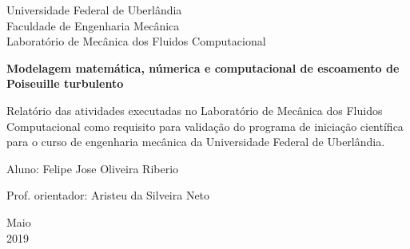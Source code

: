 \begin{titlepage}
	\begin{center}
	

		\Huge{Universidade Federal de Uberlândia}\\
		\large{Faculdade de Engenharia Mecânica}\\ 
		\large{Laboratório de Mecânica dos Fluidos Computacional}\\ 
\vspace{15pt}
        
        \vspace{85pt}
        
		\textbf{\LARGE{Modelagem matemática, númerica e computacional de escoamento de Poiseuille
				turbulento}}
			
	\end{center}
\vspace{1,5cm}
	
	\begin{flushright}

   \begin{list}{}{
      \setlength{\leftmargin}{4.5cm}
      \setlength{\rightmargin}{0cm}
      \setlength{\labelwidth}{0pt}
      \setlength{\labelsep}{\leftmargin}}

      \item Relatório das atividades executadas no Laboratório de Mecânica dos Fluidos Computacional como requisito para validação do programa de iniciação científica para o curso de engenharia mecânica da Universidade Federal de Uberlândia.

      \begin{list}{}{
      \setlength{\leftmargin}{0cm}
      \setlength{\rightmargin}{0cm}
      \setlength{\labelwidth}{0pt}
      \setlength{\labelsep}{\leftmargin}}

			\item Aluno: Felipe Jose Oliveira Riberio \
            \item Prof. orientador: Aristeu da Silveira Neto\

      \end{list}
   \end{list}
\end{flushright}
\vspace{1cm}
\begin{center}
		\vspace{\fill}
		 Maio\\
		 2019
			\end{center}
\end{titlepage}
\newpage
  	   
  	 
  	 \newpage